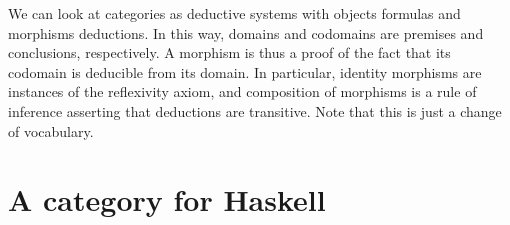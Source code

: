 \begin{example}



  \label{ex:deductive-system}

  We can look at categories as deductive systems with objects formulas
  and morphisms deductions. In this way, domains and codomains are
  premises and conclusions, respectively. A morphism is thus a proof
  of the fact that its codomain is deducible from its domain. In
  particular, identity morphisms are instances of the reflexivity
  axiom, and composition of morphisms is a rule of inference asserting
  that deductions are transitive. Note that this is just a change of
  vocabulary.


\end{example}

\section{A category for Haskell}
\label{sec:category-haskell}

